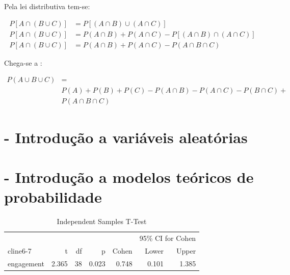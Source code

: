 \documentclass[
]{book}
\begin{document}
\hfill\break

Pela lei distributiva tem-se:

\hfill\break

\begin{align*}
P [A \cap (B \cup C)] & = P[ (A \cap B) \cup (A \cap C )  ]\\
P [A \cap (B \cup C)] & = P(A \cap B) + P(A \cap C) - P[ ( A \cap B) \cap (A \cap C)] \\
P [A \cap (B \cup C)] & = P(A \cap B) + P(A \cap C) - P( A \cap B \cap C)
\end{align*}

\hfill\break

Chega-se a :

\begin{align*}
P( A \cup B \cup C ) & = \\
                     & P(A) + P(B) +P(C) - P(A \cap B) - P(A \cap C) - P(B \cap C)  +\\
                     & P(A \cap B \cap C)
\end{align*}

\hypertarget{var_aleatoria}{%
\chapter{- Introdução a variáveis aleatórias}\label{var_aleatoria}}

\hypertarget{modelos_probabilidade}{%
\chapter{- Introdução a modelos teóricos de probabilidade}\label{modelos_probabilidade}}

\begin{table}[h]
\centering
\caption{Independent Samples T-Test}
\label{tab:independentSamplesT-Test}
{
\begin{tabular}{lrrrrrr}
\toprule
\multicolumn{1}{c}{} & \multicolumn{1}{c}{} & \multicolumn{1}{c}{} & \multicolumn{1}{c}{} & \multicolumn{1}{c}{} & \multicolumn{2}{c}{95\% CI for Cohen} \\
cline{6-7}
& t & df & p & Cohen & Lower & Upper  \\
\cmidrule[0.4pt]{1-7}
engagement & 2.365 & 38 & 0.023 & 0.748 & 0.101 & 1.385  \\
\bottomrule
\end{tabular}
}
\end{table}
\end{document}
